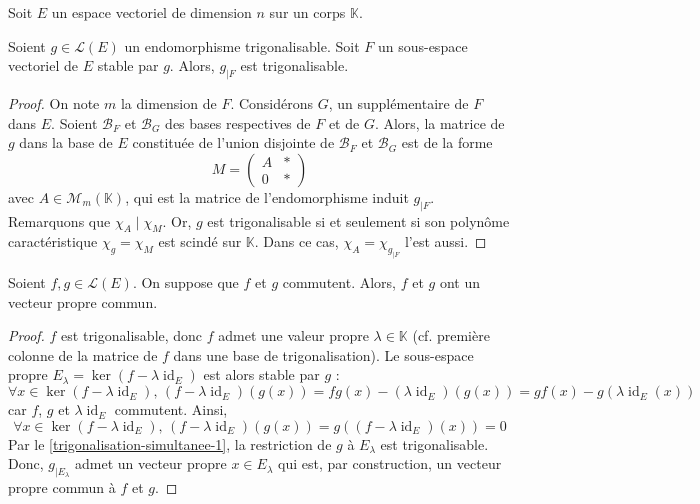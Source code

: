 






  Soit $E$ un espace vectoriel de dimension $n$ sur un corps $\mathbb{K}$.

  \begin{lemma}
    \label{trigonalisation-simultanee-1}
    Soient $g \in \mathcal{L}(E)$ un endomorphisme trigonalisable. Soit $F$ un sous-espace vectoriel de $E$ stable par $g$. Alors, $g_{|F}$ est trigonalisable.
  \end{lemma}

  \begin{proof}
    On note $m$ la dimension de $F$. Considérons $G$, un supplémentaire de $F$ dans $E$. Soient $\mathcal{B}_F$ et $\mathcal{B}_G$ des bases respectives de $F$ et de $G$. Alors, la matrice de $g$ dans la base de $E$ constituée de l'union disjointe de $\mathcal{B}_F$ et $\mathcal{B}_G$ est de la forme
    \[
      M =
      \begin{pmatrix}
        A & * \\
        0 & *
      \end{pmatrix}
    \]
    avec $A \in \mathcal{M}_m(\mathbb{K})$, qui est la matrice de l'endomorphisme induit $g_{|F}$. Remarquons que $\chi_A \mid \chi_M$. Or, $g$ est trigonalisable si et seulement si son polynôme caractéristique $\chi_g = \chi_M$ est scindé sur $\mathbb{K}$. Dans ce cas, $\chi_A = \chi_{g_{|F}}$ l'est aussi.
  \end{proof}

  \begin{lemma}
    \label{trigonalisation-simultanee-2}
    Soient $f, g \in \mathcal{L}(E)$. On suppose que $f$ et $g$ commutent. Alors, $f$ et $g$ ont un vecteur propre commun.
  \end{lemma}

  \begin{proof}
    $f$ est trigonalisable, donc $f$ admet une valeur propre $\lambda \in \mathbb{K}$ (cf. première colonne de la matrice de $f$ dans une base de trigonalisation). Le sous-espace propre $E_\lambda = \ker(f - \lambda \operatorname{id}_E)$ est alors stable par $g$ :
    \[ \forall x \in \ker(f - \lambda \operatorname{id}_E), \, (f - \lambda \operatorname{id}_E)(g(x)) = fg(x) - (\lambda \operatorname{id}_E)(g(x)) = gf(x) - g(\lambda \operatorname{id}_E(x)) \]
    car $f$, $g$ et $\lambda \operatorname{id}_E$ commutent. Ainsi,
    \[ \forall x \in \ker(f - \lambda \operatorname{id}_E), \, (f - \lambda \operatorname{id}_E)(g(x)) = g((f - \lambda \operatorname{id}_E)(x)) = 0 \]
    Par le \cref{trigonalisation-simultanee-1}, la restriction de $g$ à $E_\lambda$ est trigonalisable. Donc, $g_{|E_\lambda}$ admet un vecteur propre $x \in E_\lambda$ qui est, par construction, un vecteur propre commun à $f$ et $g$.
  \end{proof}

